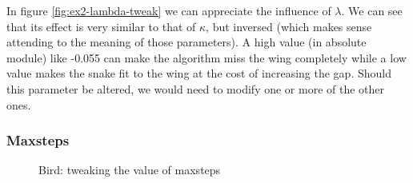 In figure \ref{fig:ex2-lambda-tweak} we can appreciate the influence of $\lambda$. We can see
that its effect is very similar to that of $\kappa$, but inversed (which makes sense attending to
the meaning of those parameters). A high value (in absolute module) like -0.055 can make the
algorithm miss the wing completely while a low value makes the snake fit to the wing at the cost
of increasing the gap. Should this parameter be altered, we would need to modify one or more
of the other ones.

\subsubsection{Maxsteps}

\begin{figure}[!hbt]
\centering
{}

\caption{Bird: tweaking the value of maxsteps}
\label{fig:ex2-maxsteps-tweak}
\end{figure}


